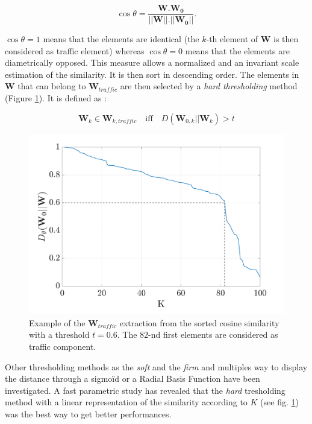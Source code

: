 \documentclass[twocolumn,a4paper,10pt]{article}
\begin{document}
\begin{equation}
\cos \theta = \frac{\mathbf{W}.\mathbf{W_0}}{\vert \vert \mathbf{W}  \vert \vert . \vert \vert \mathbf{W_0} \vert \vert}.
\end{equation}

$\cos \theta = 1$ means that the elements are identical (the $k$-th element of $\mathbf{W}$ is then considered as traffic element) whereas $\cos \theta = 0$ means that the elements are diametrically opposed. This measure allows a normalized and an invariant scale estimation of the similarity. It is then sort in descending order. The elements in $\mathbf{W}$ that can belong to $\mathbf{W}_{traffic}$ are then selected by a \textit{hard thresholding} method (Figure \ref{fig:W_THC_NMF}). It is defined as :

\begin{equation}
\mathbf{W}_k \in \mathbf{W}_{k,traffic} \quad \text{iff} \quad D\left(\mathbf{W}_{0,k} \vert \vert \mathbf{W}_{k} \right) > t
\end{equation}

\begin{figure}[hbtp]
\centering
\includegraphics[width=0.8\linewidth]{../image/distanceCosLinDisplay.pdf}
\caption{Example of the $\mathbf{W}_{traffic}$ extraction from the sorted cosine similarity with a threshold $t = 0.6$. The $82$-nd first elements are considered as traffic component.}
\label{fig:W_THC_NMF}
\end{figure}

Other thresholding methods as the \textit{soft} and the \textit{firm} and multiples way to display the distance through a sigmoïd or a Radial Basis Function have been investigated. A fast parametric study has revealed that the \textit{hard} tresholding method  with a linear representation of the similarity according to $K$ (see fig. \ref{fig:W_THC_NMF}) was the best way to get better performances. 
\end{document}
